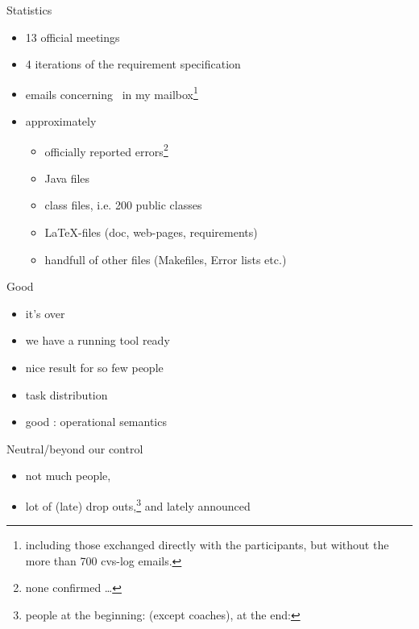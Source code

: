 \begin{myslide}{Statistics}
  \begin{itemize}
  \item 13 official meetings
  \item 4 iterations of the requirement specification
  \item {} emails concerning \Slime\ in my
    mailbox\footnote{including those exchanged directly with the
      participants, but without the more than 700 cvs-log emails.}
  \item approximately
    \begin{itemize}
    \item {} officially reported errors\footnote{none
        confirmed \ldots}
    \item {} Java files
    \item {} class files, i.e. 200 public classes
    \item {} \LaTeX-files (doc, web-pages, requirements)
    \item handfull of other files (Makefiles, Error lists etc.)
    \end{itemize}
  \end{itemize}
\end{myslide}





\begin{myslide}{Good}
  \begin{itemize}
  \item it's over
  \item we have a running tool ready
  \item nice result for so few people
  \item task distribution
  \item good :  operational
    semantics
  \end{itemize}
  
\end{myslide}
\begin{myslide}{Neutral/beyond our control}
  \begin{itemize}
  \item not much people, 
  \item lot of (late) drop outs,\footnote{people at the beginning:
       (except coaches), at the end: } and
    lately announced
  \end{itemize}
\end{myslide}

